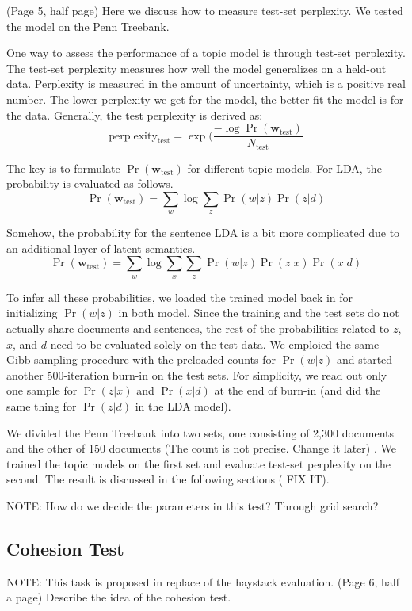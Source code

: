 { \color{red} (Page 5, half page) Here we discuss how to measure test-set
perplexity.  We tested the model on the Penn Treebank. }

One way to assess the performance of a topic model is through test-set
perplexity.  The test-set perplexity measures how well the model generalizes on
a held-out data.  Perplexity is measured in the amount of uncertainty, which is
a positive real number.  The lower perplexity we get for the model, the better
fit the model is for the data.  Generally, the test perplexity is derived as:
\[ \mathrm{perplexity_{test}} = \exp(\frac{- \log
\Pr(\mathbf{w}_\mathrm{test})}{N_\mathrm{test}} \]

The key is to formulate $\Pr(\mathbf{w}_\mathrm{test})$ for different topic
models.  For LDA, the probability is evaluated as follows.  \[
\Pr(\mathbf{w}_\mathrm{test}) = \sum_w \log \sum_z \Pr(w|z) \Pr(z|d) \]

Somehow, the probability for the sentence LDA is a bit more complicated due to
an additional layer of latent semantics.  \[ \Pr(\mathbf{w}_\mathrm{test}) =
\sum_w \log \sum_x \sum_z \Pr(w|z) \Pr(z|x) \Pr(x|d) \]

To infer all these probabilities, we loaded the trained model back in for
initializing $\Pr(w|z)$ in both model.  Since the training and the test sets do
not actually share documents and sentences, the rest of the probabilities
related to $z$, $x$, and $d$ need to be evaluated solely on the test data.  We
emploied the same Gibb sampling procedure with the preloaded counts for
$\Pr(w|z)$ and started another 500-iteration burn-in on the test sets.  For
simplicity, we read out only one sample for $\Pr(z|x)$ and $\Pr(x|d)$ at the
end of burn-in (and did the same thing for $\Pr(z|d)$ in the LDA model).

We divided the Penn Treebank into two sets, one consisting of 2,300 documents
and the other of 150 documents { \color{red} (The count is not precise. Change
it later) }.  We trained the topic models on the first set and evaluate
test-set perplexity on the second.  The result is discussed in the following
sections ({\color{red} FIX IT}).

{ \color{red} NOTE: How do we decide the parameters in this test?  Through grid
search? }

\subsection{Cohesion Test}

{ \color{red} NOTE: This task is proposed in replace of the haystack evaluation. }
{ \color{red} (Page 6, half a page) Describe the idea of the cohesion test. }

